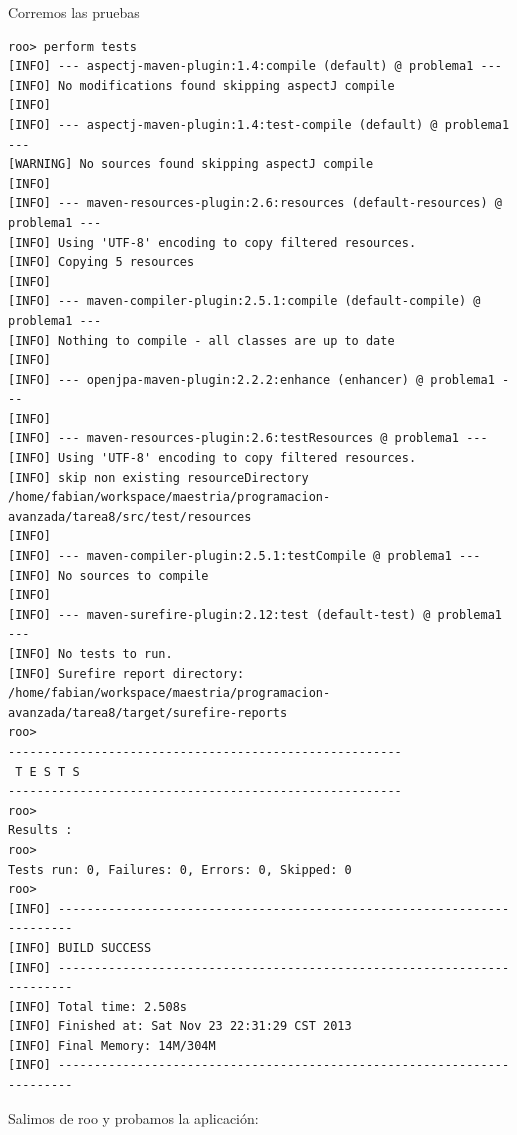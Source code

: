 \documentclass[12pt]{article}
\begin{document}
\begin{enumerate}
Corremos las pruebas
\begin{lstlisting}[frame=single] 
roo> perform tests
[INFO] --- aspectj-maven-plugin:1.4:compile (default) @ problema1 ---
[INFO] No modifications found skipping aspectJ compile
[INFO] 
[INFO] --- aspectj-maven-plugin:1.4:test-compile (default) @ problema1 ---
[WARNING] No sources found skipping aspectJ compile
[INFO] 
[INFO] --- maven-resources-plugin:2.6:resources (default-resources) @ problema1 ---
[INFO] Using 'UTF-8' encoding to copy filtered resources.
[INFO] Copying 5 resources
[INFO] 
[INFO] --- maven-compiler-plugin:2.5.1:compile (default-compile) @ problema1 ---
[INFO] Nothing to compile - all classes are up to date
[INFO] 
[INFO] --- openjpa-maven-plugin:2.2.2:enhance (enhancer) @ problema1 ---
[INFO] 
[INFO] --- maven-resources-plugin:2.6:testResources @ problema1 ---
[INFO] Using 'UTF-8' encoding to copy filtered resources.
[INFO] skip non existing resourceDirectory 
/home/fabian/workspace/maestria/programacion-avanzada/tarea8/src/test/resources
[INFO] 
[INFO] --- maven-compiler-plugin:2.5.1:testCompile @ problema1 ---
[INFO] No sources to compile
[INFO] 
[INFO] --- maven-surefire-plugin:2.12:test (default-test) @ problema1 ---
[INFO] No tests to run.
[INFO] Surefire report directory: 
/home/fabian/workspace/maestria/programacion-avanzada/tarea8/target/surefire-reports
roo> 
-------------------------------------------------------
 T E S T S
-------------------------------------------------------
roo> 
Results :
roo> 
Tests run: 0, Failures: 0, Errors: 0, Skipped: 0
roo> 
[INFO] ------------------------------------------------------------------------
[INFO] BUILD SUCCESS
[INFO] ------------------------------------------------------------------------
[INFO] Total time: 2.508s
[INFO] Finished at: Sat Nov 23 22:31:29 CST 2013
[INFO] Final Memory: 14M/304M
[INFO] ------------------------------------------------------------------------
\end{lstlisting}

Salimos de roo y probamos la aplicación:


\end{enumerate}
\end{document}
